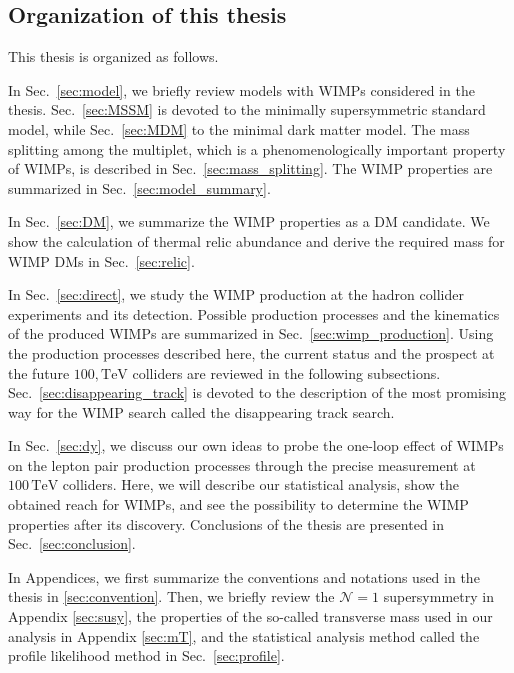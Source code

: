 \documentclass[12pt,twoside,book]{article}
\begin{document}
\clearpage


\subsection{Organization of this thesis}
\setcounter{equation}{0}

This thesis is organized as follows.

In Sec.~\ref{sec:model}, we briefly review models with WIMPs considered in the thesis.
Sec.~\ref{sec:MSSM} is devoted to the minimally supersymmetric standard model, while Sec.~\ref{sec:MDM} to the minimal dark matter model.
The mass splitting among the multiplet, which is a phenomenologically important property of WIMPs, is described in Sec.~\ref{sec:mass_splitting}.
The WIMP properties are summarized in Sec.~\ref{sec:model_summary}.

In Sec.~\ref{sec:DM}, we summarize the WIMP properties as a DM candidate.
We show the calculation of thermal relic abundance and derive the required mass for WIMP DMs in Sec.~\ref{sec:relic}.

In Sec.~\ref{sec:direct}, we study the WIMP production at the hadron collider experiments and its detection.
Possible production processes and the kinematics of the produced WIMPs are summarized in Sec.~\ref{sec:wimp_production}.
Using the production processes described here, the current status and the prospect at the future $100,\mathrm{TeV}$ colliders are reviewed in the following subsections.
Sec.~\ref{sec:disappearing_track} is devoted to the description of the most promising way for the WIMP search called the disappearing track search.

In Sec.~\ref{sec:dy}, we discuss our own ideas \cite{Chigusa:2018vxz,Abe:2019egv} to probe the one-loop effect of WIMPs on the lepton pair production processes through the precise measurement at $100\,\mathrm{TeV}$ colliders.
Here, we will describe our statistical analysis, show the obtained reach for WIMPs, and see the possibility to determine the WIMP properties after its discovery.
Conclusions of the thesis are presented in Sec.~\ref{sec:conclusion}.

In Appendices, we first summarize the conventions and notations used in the thesis in \ref{sec:convention}.
Then, we briefly review the $\mathcal{N}=1$ supersymmetry in Appendix \ref{sec:susy}, the properties of the so-called transverse mass used in our analysis in Appendix \ref{sec:mT}, and the statistical analysis method called the profile likelihood method in Sec.~\ref{sec:profile}.
\end{document}
